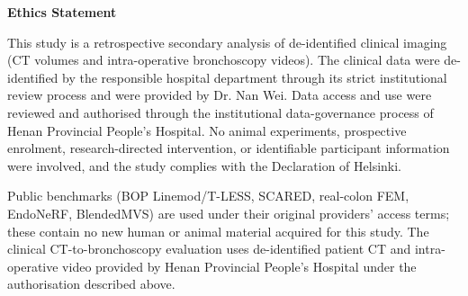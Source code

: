 \documentclass[11pt]{article}
\begin{document}
\begin{center}\textbf{Ethics Statement}\end{center}

This study is a retrospective secondary analysis of de-identified clinical
imaging (CT volumes and intra-operative bronchoscopy videos). The clinical data
were de-identified by the responsible hospital department through its strict
institutional review process and were provided by Dr. Nan Wei. Data access and
use were reviewed and authorised through the institutional data-governance
process of Henan Provincial People's Hospital. No animal experiments,
prospective enrolment, research-directed intervention, or identifiable
participant information were involved, and the study complies with the
Declaration of Helsinki.

Public benchmarks (BOP Linemod/T-LESS, SCARED, real-colon FEM, EndoNeRF,
BlendedMVS) are used under their original providers' access terms; these
contain no new human or animal material acquired for this study. The clinical
CT-to-bronchoscopy evaluation uses de-identified patient CT and intra-operative
video provided by Henan Provincial People's Hospital under the authorisation
described above.
\end{document}
